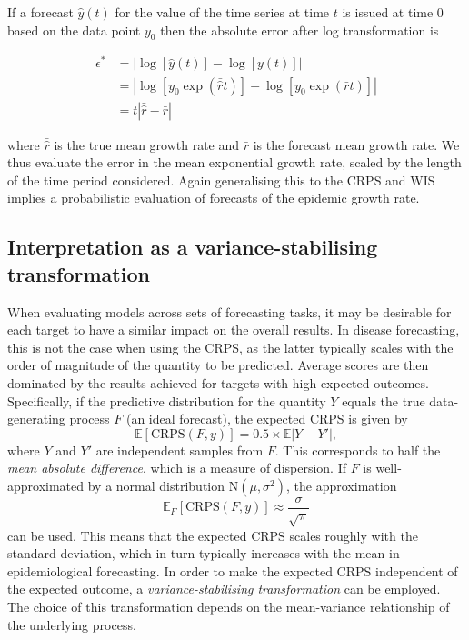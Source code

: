 \documentclass{article}
\begin{document}
If a forecast $\hat{y}(t)$ for the value of the time series at time $t$ is issued at time 0 based on the data point $y_0$ then the absolute error after log transformation is
%
\begin{linenomath*}
\begin{align*}
\epsilon^* &= \left| \log \left[ \hat{y}( t ) \right] - \log \left[ y ( t ) \right] \right|\\
           &= \left| \log \left[ y_0 \exp (\bar{\hat{r}} t ) \right] - \log \left[ y_0 \exp (\bar{r}t) \right] \right|\\
           &= t \left| \bar{\hat{r}} - \bar{r} \right|
\end{align*}
\end{linenomath*}
%
where $\bar{\hat{r}}$ is the true mean growth rate and $\bar{r}$ is the forecast mean growth rate. We thus evaluate the error in the mean exponential growth rate, scaled by the length of the time period considered. Again generalising this to the CRPS and WIS implies a probabilistic evaluation of forecasts of the epidemic growth rate.

\subsection{Interpretation as a variance-stabilising transformation}
\label{sec:methods:vst}

When evaluating models across sets of forecasting tasks, it may be desirable for each target to have a similar impact on the overall results. In disease forecasting, this is not the case when using the CRPS, as the latter typically scales with the order of magnitude of the quantity to be predicted. Average scores are then dominated by the results achieved for targets with high expected outcomes. 
Specifically, if the predictive distribution for the quantity $Y$ equals the true data-generating process $F$ (an ideal forecast), the expected CRPS is given by \citep{gneitingStrictlyProperScoring2007}
$$
\mathbb{E}[\text{CRPS}(F, y)] = 0.5\times\mathbb{E}|Y - Y'|,
$$
where $Y$ and $Y'$ are independent samples from $F$. This corresponds to half the \textit{mean absolute difference}, which is a measure of dispersion. If $F$ is well-approximated by a normal distribution $\text{N}(\mu, \sigma^2)$, the approximation
$$
\mathbb{E}_F[\text{CRPS}(F, y)] \approx \frac{\sigma}{\sqrt{\pi}}
$$
can be used. This means that the expected CRPS scales roughly with the standard deviation, which in turn typically increases with the mean in epidemiological forecasting. In order to make the expected CRPS independent of the expected outcome, a \textit{variance-stabilising transformation} \citep[VST,][]{bartlettSquareRootTransformation1936} can be employed. The choice of this transformation depends on the mean-variance relationship of the underlying process. 
\end{document}
